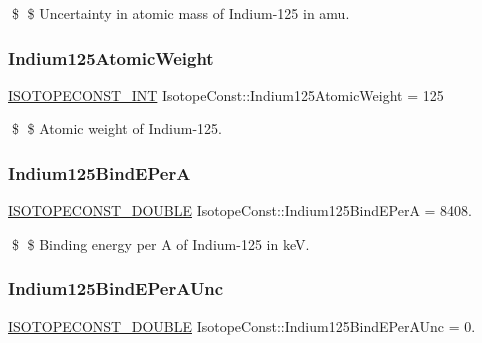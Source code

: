 \$ \$ Uncertainty in atomic mass of Indium-\/125 in amu. \mbox{\label{group___isotope_const-_indium-_in125_gae3a799edd88350b2da04250bff1402ae}} 
\subsubsection{\texorpdfstring{Indium125\+Atomic\+Weight}{Indium125AtomicWeight}}
{\footnotesize\ttfamily \mbox{\hyperlink{group___isotope_const-_macros_ga5f18360b3e99483a35c32d789e62621c}{I\+S\+O\+T\+O\+P\+E\+C\+O\+N\+S\+T\+\_\+\+I\+NT}} Isotope\+Const\+::\+Indium125\+Atomic\+Weight = 125}

\$ \$ Atomic weight of Indium-\/125. \mbox{\label{group___isotope_const-_indium-_in125_gaf92db647cfdfb0a3a70eb2cdbc09b06f}} 
\subsubsection{\texorpdfstring{Indium125\+Bind\+E\+PerA}{Indium125BindEPerA}}
{\footnotesize\ttfamily \mbox{\hyperlink{group___isotope_const-_macros_ga8f45a7272ce02c0b4c65c44636ed719a}{I\+S\+O\+T\+O\+P\+E\+C\+O\+N\+S\+T\+\_\+\+D\+O\+U\+B\+LE}} Isotope\+Const\+::\+Indium125\+Bind\+E\+PerA = 8408.}

\$ \$ Binding energy per A of Indium-\/125 in keV. \mbox{\label{group___isotope_const-_indium-_in125_gafead977dab72719d74528685e1459921}} 
\subsubsection{\texorpdfstring{Indium125\+Bind\+E\+Per\+A\+Unc}{Indium125BindEPerAUnc}}
{\footnotesize\ttfamily \mbox{\hyperlink{group___isotope_const-_macros_ga8f45a7272ce02c0b4c65c44636ed719a}{I\+S\+O\+T\+O\+P\+E\+C\+O\+N\+S\+T\+\_\+\+D\+O\+U\+B\+LE}} Isotope\+Const\+::\+Indium125\+Bind\+E\+Per\+A\+Unc = 0.}

